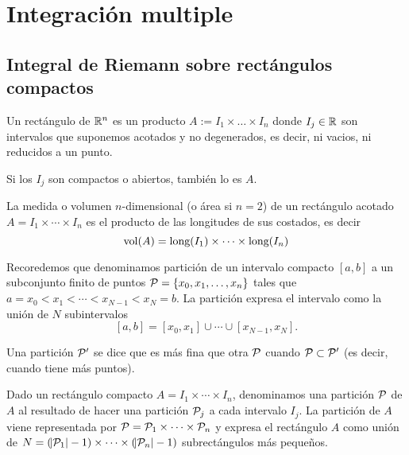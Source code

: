 \chapter{Integración multiple}

\section{Integral de Riemann sobre rectángulos compactos}

\begin{defi}
    Un rectángulo de $\mathbb{R}^n$ es un producto $A := I_1 \times \dots \times I_n$
    donde $I_j \in \mathbb{R}$ son intervalos que suponemos acotados y no degenerados,
    es decir, ni vacios, ni reducidos a un punto.

    Si los $I_j$ son compactos o abiertos, también lo es $A$.
\end{defi}

\begin{defi}
    La medida o volumen $n$-dimensional (o área si $n=2$) de un rectángulo
    acotado $A = I_1 \times \cdots \times I_n$ es el producto de las longitudes
    de sus costados, es decir
    \[
        \operatorname{vol}(A) = \text{long} (I_1) \times \dots \times \text{long} (I_n)
    \]
\end{defi}

\begin{obs}
    Recoredemos que denominamos partición de un intervalo compacto $[a,b]$ a un
    subconjunto finito de puntos $\mathcal{P}=\left\{x_0,x_1,\dots,x_n\right\}$ tales que
    $a = x_0 < x_1 < \cdots < x_{N-1} < x_N = b$. La partición expresa el intervalo
    como la unión de $N$ subintervalos
    \[
        [a,b] = [x_0,x_1] \cup \cdots \cup [x_{N-1},x_N].
    \]
\end{obs}
\begin{obs}
    Una partición $\mathcal{P}^\prime$ se dice que es más fina que otra
    $\mathcal{P}$ cuando $\mathcal{P} \subset \mathcal{P}^\prime$ (es decir, cuando
    tiene más puntos).
\end{obs}

\begin{defi}
    Dado un rectángulo compacto $A = I_1 \times \cdots \times I_n$, denominamos
    una partición $\mathcal{P}$ de $A$ al resultado de hacer una partición $\mathcal{P}_j$ a cada
    intervalo $I_j$.
    La partición de $A$ viene representada por $\mathcal{P} = \mathcal{P}_1 \times \cdots \times
    \mathcal{P}_n$ y expresa el rectángulo $A$ como unión de $N = (\abs{\mathcal{P}_1}-1) \times
    \cdots \times (\abs{\mathcal{P}_n}-1)$ subrectángulos más pequeños.
\end{defi}

